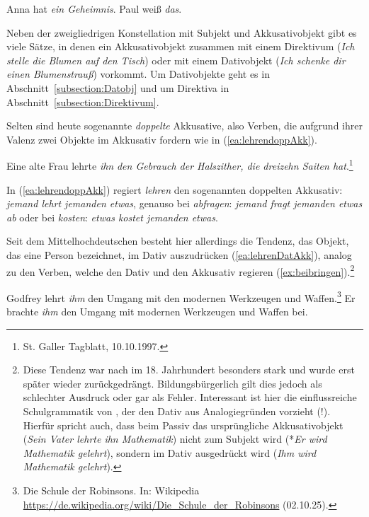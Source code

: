 \ea \label{ea:schwachtransitiv}
\ea \label{ea:Besitz} Anna hat \textit{ein Geheimnis}.
\ex \label{ex:PsychZustand} Paul weiß \textit{das}.
\z 
\z 


Neben der zweigliedrigen Konstellation mit Subjekt und Akkusativobjekt gibt es viele Sätze, in denen ein Akkusativobjekt zusammen mit einem Direktivum (\textit{Ich stelle die Blumen auf den Tisch}) oder mit einem Dativobjekt (\textit{Ich schenke dir einen Blumenstrauß}) vorkommt. Um Dativobjekte geht es in Abschnitt~\ref{subsection:Datobj} und um Direktiva in Abschnitt~\ref{subsection:Direktivum}.

Selten sind heute sogenannte \textit{doppelte} Akkusative, also Verben, die aufgrund ihrer Valenz zwei Objekte im Akkusativ fordern wie in (\ref{ea:lehrendoppAkk}). 

\ea \label{ea:lehrendoppAkk} Eine alte Frau lehrte \textit{ihn} \textit{den Gebrauch der Halszither, die dreizehn Saiten hat}.\footnote{St. Galler Tagblatt, 10.10.1997.}
\z 


In (\ref{ea:lehrendoppAkk}) regiert \textit{lehren} den sogenannten doppelten Akkusativ: \textit{jemand lehrt jemanden etwas}, genauso bei \textit{abfragen}: \textit{jemand fragt jemanden etwas ab} oder bei \textit{kosten}: \textit{etwas kostet jemanden etwas}. 

Seit dem Mittelhochdeutschen besteht hier allerdings die Tendenz, das Objekt, das eine Person bezeichnet, im Dativ auszudrücken (\ref{ea:lehrenDatAkk}), analog zu den Verben, welche den Dativ und den Akkusativ regieren (\ref{ex:beibringen}).\footnote{Diese Tendenz war nach \citet[254]{Paul1919} im 18. Jahrhundert besonders stark und wurde erst später wieder zurückgedrängt. Bildungsbürgerlich gilt dies jedoch als schlechter Ausdruck oder gar als Fehler. Interessant ist hier die einflussreiche Schulgrammatik von \citet[417]{Adelung1782}, der den Dativ aus Analogiegründen vorzieht (!). Hierfür spricht auch, dass beim Passiv das ursprüngliche Akkusativobjekt (\textit{Sein Vater lehrte ihn Mathematik}) nicht zum Subjekt wird (*\textit{Er wird Mathematik gelehrt}), sondern im Dativ ausgedrückt wird (\textit{Ihm wird Mathematik gelehrt}).}

\ea \label{ea:Dat_statt_Doppelakkusativ}
\ea \label{ea:lehrenDatAkk} Godfrey lehrt \textit{ihm} den Umgang mit den modernen Werkzeugen und Waffen.\footnote{Die Schule der Robinsons. In: Wikipedia \url{https://de.wikipedia.org/wiki/Die_Schule_der_Robinsons} (02.10.25).}
\ex \label{ex:beibringen} Er brachte \textit{ihm} den Umgang mit modernen Werkzeugen und Waffen bei.
\z 
\z 

